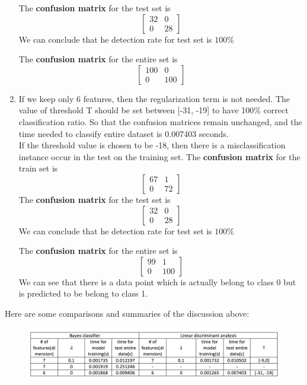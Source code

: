 \documentclass[a4paper]{article}
\begin{document}
\begin{spacing}{2.0}
\begin{enumerate}
The \textbf{confusion matrix} for the test set is 
$$\begin{bmatrix}
32 & 0 \\
0 & 28 
\end{bmatrix}$$
We can conclude that he detection rate for test set is $100\%$

The \textbf{confusion matrix} for the entire set is 
$$\begin{bmatrix}
100 & 0 \\
0 & 100 
\end{bmatrix}$$
\item
If we keep only 6 features, then the regularization term is not needed. The value of threshold T should be set between [-31, -19] to have 100\% correct classification ratio. So that the confusion matrices remain unchanged, and the time needed to classify entire dataset is 0.007403 seconds.\\
If the threshold value is chosen to be -18, then there is a misclassification instance occur in the test on the training set. The \textbf{confusion matrix} for the train set is 
$$\begin{bmatrix}
67 & 1 \\
0 & 72 
\end{bmatrix}$$
The \textbf{confusion matrix} for the test set is 
$$\begin{bmatrix}
32 & 0 \\
0 & 28 
\end{bmatrix}$$
We can conclude that he detection rate for test set is $100\%$

The \textbf{confusion matrix} for the entire set is 
$$\begin{bmatrix}
99 & 1 \\
0 & 100 
\end{bmatrix}$$
We can see that there is a data point which is actually belong to class 0 but is predicted to be belong to class 1.
\end{enumerate}

Here are some comparisons and summaries of the discussion above:
\begin{figure}[htbp]
\centering \includegraphics[width = 7in]{comparison.jpg}
\end{figure}


\end{spacing}
\end{document}
